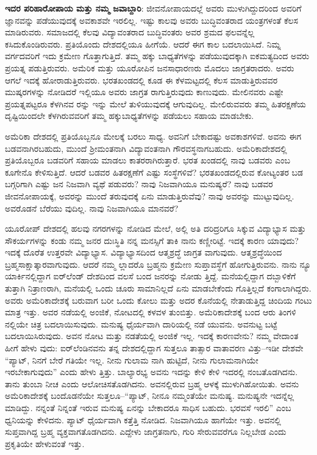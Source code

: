 \textbf{ಇದರ ಪರಿಹಾರೋಪಾಯ ಮತ್ತು ನಮ್ಮ ಜವಾಬ್ದಾರಿ}: ಜೀವನೋಪಾಯದಲ್ಲೆ ಅವರು ಮುಳುಗಿದ್ದುದರಿಂದ ಅವರಿಗೆ ಜ್ಞಾನವನ್ನು ಪಡೆಯುವುದಕ್ಕೆ ಅವಕಾಶವೇ ಇರಲಿಲ್ಲ. ಇಷ್ಟು ಕಾಲವು ಅವರು ಬುದ್ಧಿವಂತರಾದ ಯಂತ್ರಗಳಂತೆ ಕೆಲಸ ಮಾಡಿರುವರು. ಸಮಾಜದಲ್ಲಿ ಕೆಲವು ವಿದ್ಯಾವಂತರಾದ ಬುದ್ಧಿವಂತರು ಅವರ ಶ್ರಮದ ಫಲವನ್ನೆಲ್ಲ ಕಸಿದುಕೊಂಡಿರುವರು. ಪ್ರತಿಯೊಂದು ದೇಶದಲ್ಲಿಯೂ ಹೀಗೆಯೆ. ಆದರೆ ಈಗ ಕಾಲ ಬದಲಾಯಿಸಿದೆ. ನಿಮ್ನ ವರ್ಗದವರಿಗೆ ಇದು ಕ್ರಮೇಣ ಗೊತ್ತಾಗುತ್ತಿದೆ. ತಮ್ಮ ಹಕ್ಕು ಬಾಧ್ಯತೆಗಳನ್ನು ಪಡೆಯುವುದಕ್ಕಾಗಿ ಐಕಮತ್ಯದಿಂದ ಅವರು ಪ್ರಯತ್ನ ಪಡುತ್ತಿರುವರು. ಅಮೆರಿಕ ಮತ್ತು ಯೂರೋಪಿನ ಜನಸಾಧಾರಣರು ಮೊದಲು ಜಾಗ್ರತರಾದರು. ಅವರು ಆಗಲೆ ಇದಕ್ಕೆ ಹೋರಾಡುತ್ತಿರುವರು. ಭರತಖಂಡದಲ್ಲಿ ಕೂಡ ಈ ಕೆಳಮಟ್ಟದಲ್ಲಿ ಕೆಲಸ ಮಾಡುತ್ತಿರುವವರ ಮುಷ್ಕರಗಳನ್ನು ನೋಡಿದರೆ ಇಲ್ಲಿಯೂ ಅವರು ಜಾಗ್ರತ ರಾಗುತ್ತಿರುವುದು ಕಾಣುವುದು. ಮೇಲಿನವರು ಎಷ್ಟೇ ಪ್ರಯತ್ನಪಟ್ಟರೂ ಕೆಳಗಿನವ ರನ್ನು ಇನ್ನು ಮೇಲೆ ತುಳಿಯುವುದಕ್ಕೆ ಆಗುವುದಿಲ್ಲ. ಮೇಲಿರುವವರು ತಮ್ಮ ಹಿತರಕ್ಷಣೆಯ ದೃಷ್ಟಿಯಿಂದಲೇ ಕೆಳಗಿರುವವರಿಗೆ ತಮ್ಮ ಹಕ್ಕುಬಾಧ್ಯತೆಗಳನ್ನು ಪಡೆಯಲು ಸಹಾಯ ಮಾಡಬೇಕು.

ಅಮೆರಿಕಾ ದೇಶದಲ್ಲಿ ಪ್ರತಿಯೊಬ್ಬನೂ ಮೇಲಕ್ಕೆ ಬರಲು ಸಾಧ್ಯ. ಅವನಿಗೆ ಬೇಕಾದಷ್ಟು ಅವಕಾಶಗಳಿವೆ. ಅವನು ಈಗ ಬಡವನಾಗಿರಬಹುದು, ಮುಂದೆ ಶ್ರೀಮಂತನಾಗಿ ವಿದ್ಯಾವಂತನಾಗಿ ಗೌರವಸ್ಥನಾಗಬಹುದು. ಅಮೆರಿಕಾದೇಶದಲ್ಲಿ ಪ್ರತಿಯೊಬ್ಬರೂ ಬಡವರಿಗೆ ಸಹಾಯ ಮಾಡಲು ಕಾತರರಾಗಿರುತ್ತಾರೆ. ಭರತ ಖಂಡದಲ್ಲಿ ನಾವು ಬಡವರು ಎಂಬ ಕೂಗೇನೊ ಕೇಳಿಸುತ್ತಿದೆ. ಆದರೆ ಬಡವರ ಹಿತರಕ್ಷಣೆಗೆ ಎಷ್ಟು ಸಂಸ್ಥೆಗಳಿವೆ? ಭರತಖಂಡದಲ್ಲಿರುವ ಕೋಟ್ಯಂತರ ಬಡ ಬಗ್ಗರಿಗಾಗಿ ಎಷ್ಟು ಜನ ನಿಜವಾಗಿ ವ್ಯಥೆ ಪಡುವರು? ನಾವು ನಿಜವಾಗಿಯೂ ಮನುಷ್ಯರೆ? ನಾವು ಬಡವರ ಜೀವನೋಪಾಯಕ್ಕೆ, ಅವರನ್ನು ಮುಂದೆ ತರುವುದಕ್ಕೆ ಏನು ಮಾಡುತ್ತಿರುವೆವು? ನಾವು ಅವರನ್ನು ಮುಟ್ಟುವುದಿಲ್ಲ. ಅವರೊಡನೆ ಬೆರೆಯು ವುದಿಲ್ಲ. ನಾವು ನಿಜವಾಗಿಯೂ ಮಾನವರೆ?

ಯೂರೋಪ್ ದೇಶದಲ್ಲಿ ಹಲವು ನಗರಗಳನ್ನು ನೋಡಿದ ಮೇಲೆ, ಅಲ್ಲಿ ಅತಿ ದರಿದ್ರರಿಗೂ ಸಿಕ್ಕುವ ವಿದ್ಯಾಭ್ಯಾಸ ಮತ್ತು ಸೌಕರ್ಯಗಳನ್ನು ಕಂಡು ನಮ್ಮ ಜನರ ದುಃಸ್ಥಿತಿ ನನ್ನ ಮನಸ್ಸಿಗೆ ತಾಕಿ ನಾನು ಕಣ್ಣೀರಿಟ್ಟೆ. ಇದಕ್ಕೆ ಕಾರಣ ಯಾವುದು? ಇದಕ್ಕೆ ದೊರೆತ ಉತ್ತರವೇ ವಿದ್ಯಾಭ್ಯಾಸ. ವಿದ್ಯಾಭ್ಯಾಸದಿಂದ ಆತ್ಮಶ್ರದ್ಧೆ ಜಾಗ್ರತ ವಾಗುವುದು. ಆತ್ಮಶ್ರದ್ಧೆಯಿಂದ ಬ್ರಹ್ಮಸಾಕ್ಷಾತ್ಕಾರವಾಗುವುದು. ಆದರೆ ನಮ್ಮ ಲ್ಲಾದರೊ ಬ್ರಹ್ಮನು ಕ್ರಮೇಣ ಸುಪ್ತಾವಸ್ಥೆಗೆ ಹೋಗುತ್ತಿರುವನು. ನಾನು ನ್ಯೂ ಯಾರ್ಕಿನಲ್ಲಿದ್ದಾಗ ಐರ್​ಲೆಂಡ್ ದೇಶದಿಂದ ವಲಸೆ ಬಂದ ಜನರನ್ನು ನೋಡು ತ್ತಿದ್ದೆ. ಮನೆಯಲ್ಲಿದ್ದಾಗ ದಬ್ಬಾಳಿಕೆಗೆ ತುತ್ತಾಗಿ ನಿತ್ರಾಣರಾಗಿ, ಮನೆಯಲ್ಲಿ ಒಂದು ಚೂರು ಸಾಮಾನಿಲ್ಲದೆ ಏನು ಮಾಡಬೇಕೆಂದು ಗೊತ್ತಿಲ್ಲದೆ ಕಂಗಾಲಾಗಿದ್ದರು. ಅವರು ಅಮೆರಿಕಾದೇಶಕ್ಕೆ ಬರುವಾಗ ಬರೀ ಒಂದು ಕೋಲು ಮತ್ತು ಅದರ ಕೊನೆಯಲ್ಲಿ ನೇತಾಡುತ್ತಿದ್ದ ಚಿಂದಿಯ ಗಂಟು ಮಾತ್ರ ಇತ್ತು. ಅವರ ನಡೆಯಲ್ಲಿ ಅಂಜಿಕೆ, ನೋಟದಲ್ಲಿ ಕಳವಳ ತುಂಬಿತ್ತು. ಅಮೆರಿಕಾದೇಶಕ್ಕೆ ಬಂದ ಆರು ತಿಂಗಳಿ ನಲ್ಲಿಯೇ ಚಿತ್ರ ಬದಲಾಯಿಸುವುದು. ಮನುಷ್ಯ ಧೈರ್ಯವಾಗಿ ದಾರಿಯಲ್ಲಿ ನಡೆ ಯುವನು. ಅವನುಟ್ಟ ಬಟ್ಟೆ ಬದಲಾಯಿಸಿರುವುದು. ಅವನ ನೋಟ ಮತ್ತು ನಡತೆಯಲ್ಲಿ ಅಂಜಿಕೆ ಇಲ್ಲ. ಇದಕ್ಕೆ ಕಾರಣವೇನು? ನಮ್ಮ ವೇದಾಂತ ಹೀಗೆ ಹೇಳು ವುದು: ಐರ್​ಲೆಂಡಿನವನು ತನ್ನ ದೇಶದಲ್ಲಿದ್ದಾಗ ಸುತ್ತಲೂ ತಾತ್ಸಾರ ವಾತಾವರಣ ವಿತ್ತು–ಇಡೀ ದೇಶವೇ “ಪ್ಯಾಟ್, ನಿನಗೆ ಬೇರೆ ಗತಿಯೇ ಇಲ್ಲ. ನೀನು ಗುಲಾಮ ನಾಗಿ ಹುಟ್ಟಿದೆ, ನೀನು ಗುಲಾಮನಾಗಿಯೇ ಇರಬೇಕಾಗುವುದು” ಎಂದು ಹೇಳು ತ್ತಿತ್ತು. ಬಾಲ್ಯಾರಭ್ಯ ಅವನು ಇದನ್ನು ಕೇಳಿ ಕೇಳಿ ಇದರಲ್ಲಿ ನಂಬತೊಡಗಿದನು. ತಾನು ತುಂಬಾ ನೀಚ ಎಂದು ಆಲೋಚಿಸತೊಡಗಿದನು. ಅವನಲ್ಲಿರುವ ಬ್ರಹ್ಮ ಆಳಕ್ಕೆ ಮುಳುಗಿಹೋಯಿತು. ಅವನು ಅಮೆರಿಕಾದೇಶಕ್ಕೆ ಬಂದೊಡನೆಯೇ ಸುತ್ತಲೂ–“ಪ್ಯಾಟ್, ನೀನೂ ನಮ್ಮಂತೆಯೇ ಮನುಷ್ಯ. ಮನುಷ್ಯನೇ ಇದನ್ನೆಲ್ಲ ಮಾಡಿದ್ದು. ನನ್ನಂತೆ ನಿನ್ನಂತೆ ಇರುವ ಮನುಷ್ಯ ಏನನ್ನು ಬೇಕಾದರೂ ಸಾಧಿಸ ಬಹುದು. ಭರವಸೆ ಇರಲಿ” ಎಂಬ ಧ್ವನಿಯನ್ನು ಕೇಳಿದನು. ಪ್ಯಾಟ್ ಧೈರ್ಯವಾಗಿ ಕತ್ತೆತ್ತಿ ನೋಡಿದ. ನಿಜವಾಗಿಯೂ ಹಾಗೆಯೇ ಇತ್ತು. ಅವನಲ್ಲಿ ಸುಪ್ತವಾಗಿದ್ದ ಬ್ರಹ್ಮ ವ್ಯಕ್ತವಾಗತೊಡಗಿದನು. ಎದ್ದೇಳು ಜಾಗ್ರತನಾಗು, ಗುರಿ ಸೇರುವವರೆಗೂ ನಿಲ್ಲಬೇಡ ಎಂದು ಪ್ರಕೃತಿಯೇ ಹೇಳುವಂತೆ ಇತ್ತು.

